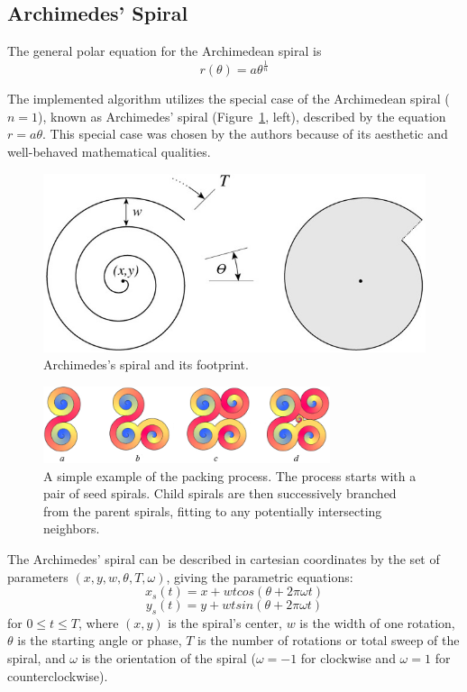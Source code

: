 \documentclass[11pt]{IEEEtran}
\begin{document}
\subsection{Archimedes' Spiral}	
The general polar equation for the Archimedean spiral is 
\begin{equation} 
\label{eq:1} 
	r(\theta) = a\theta^\frac{1}{n} 
\end{equation}

The implemented algorithm utilizes the special case of the Archimedean spiral ($n=1$), known as Archimedes' spiral (Figure~\ref{fig:spiral}, left), described by the equation $ r = a\theta $. This special case was chosen by the authors because of its aesthetic and well-behaved mathematical qualities.\cite{Browne2006834}
	
\begin{figure}[h]
\centering
\includegraphics[width=0.9\linewidth]{spiral-packing-fig-02}
\caption{Archimedes's spiral and its footprint. \cite{Browne2006834}}
\label{fig:spiral}
\end{figure}

\begin{figure}[b!]
\centering
\includegraphics[width=0.75\textwidth]{spiral-branching}
\caption{A simple example of the packing process. The process starts with a pair of seed spirals. Child spirals are then successively branched from the parent spirals, fitting to any potentially intersecting neighbors.}
\label{fig:branch}
\end{figure}

The Archimedes' spiral can be described in cartesian coordinates by the set of parameters $(x,y,w,\theta,T,\omega)$, giving the parametric equations:
\begin{equation} 
\label{eq:2} 
	x_{s}(t) = x + wt cos(\theta + 2\pi\omega t)
\end{equation}
\begin{equation}
\label{eq:3} 
	y_{s}(t) = y + wt sin(\theta + 2\pi\omega t) 
\end{equation}
for $0 \leq t \leq T$, where $(x,y)$ is the spiral's center, $w$ is the width of one rotation, $\theta$ is the starting angle or phase, $T$ is the number of rotations or total sweep of the spiral, and $\omega$ is the orientation of the spiral ($\omega = -1$ for clockwise and $\omega = 1$ for counterclockwise).
\end{document}
